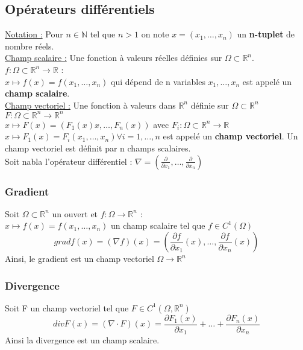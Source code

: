 \documentclass[../main.tex]{subfiles}
\begin{document}
\localtableofcontents
\subsection{Opérateurs différentiels}
\quad \underline{Notation :} Pour $n \in \mathbb{N}$ tel que $n > 1$ on note $x=(x_1, \dots, x_n)$ un \textbf{n-tuplet} de nombre réels.\\

\underline{Champ scalaire :} Une fonction à valeurs réelles définies sur $\Omega \subset \mathbb{R}^n$. $f: \Omega \subset \mathbb{R}^n \rightarrow \mathbb{R}$ :\\
$x\mapsto f(x) = f(x_1, \dots, x_n)$ qui dépend de n variables $x_1, \dots, x_n$ est appelé un \textbf{champ scalaire}.\\
\underline{Champ vectoriel :} Une fonction à valeurs dans $\mathbb{R}^n$ définie sur $\Omega \subset \mathbb{R}^n$ $F:\Omega \subset \mathbb{R}^n \rightarrow \mathbb{R}^n$ \\
$x \mapsto F(x) = (F_1(x)x, \dots , F_n(x))$ avec $F_i : \Omega \subset \mathbb{R}^n \rightarrow \mathbb{R}$ $x\mapsto F_1(x) = F_i(x_1, \dots, x_n) \forall i=1,\dots, n$ est appelé un \textbf{champ vectoriel}. Un champ vectoriel est définit par n champs scalaires.\\

Soit nabla l'opérateur différentiel : $\nabla = (\frac{\partial }{\partial x_1}, \dots, \frac{\partial}{\partial x_n})$\\

\subsubsection{Gradient}
Soit $\Omega \subset \mathbb{R}^n$ un ouvert et $f:\Omega \rightarrow \mathbb{R}^n$ :\\
$x\mapsto f(x) =f(x_1, \dots, x_n)$ un champ scalaire tel que $f\in C^1(\Omega)$\\
\begin{equation}
    grad f(x) = (\nabla f)(x) = (\frac{\partial f}{\partial x_1}(x), \dots, \frac{\partial f}{\partial x_n}(x))
\end{equation}
Ainsi, le gradient est un champ vectoriel $\Omega \rightarrow \mathbb{R}^n$\\

\subsubsection{Divergence}
Soit F un champ vectoriel tel que $F \in C^1(\Omega, \mathbb{R}^n)$\\
\begin{equation}
    div F(x) = (\nabla \cdot F)(x) = \frac{\partial F_1(x)}{\partial x_1} + \dots + \frac{\partial F_n(x)}{\partial x_n}
\end{equation}
Ainsi la divergence est un champ scalaire.\\
\end{document}
